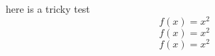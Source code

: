 here is a tricky test \begin{equation*}f(x)=x^2\end{equation*} \begin{equation*}f(x)=x^2\end{equation*} \begin{equation*}f(x)=x^2\end{equation*} 

